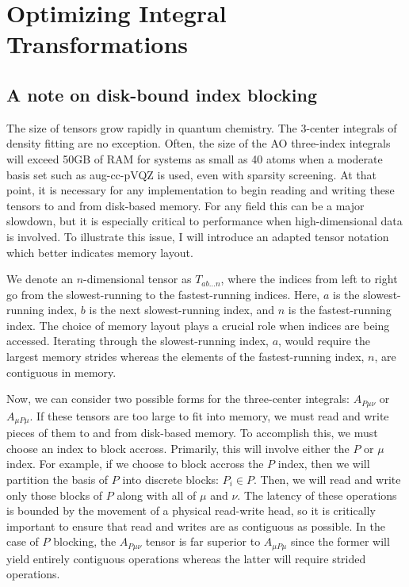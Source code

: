 \chapter{Optimizing Integral Transformations}

\section{A note on disk-bound index blocking}

The size of tensors grow rapidly in quantum chemistry.  The 3-center integrals of density fitting are no exception.
Often, the size of the AO three-index integrals will exceed 50GB of RAM for systems as small as 40 atoms when
a moderate basis set such as aug-cc-pVQZ is used, even with sparsity screening.  At that point, it is necessary for
any implementation to begin reading and writing these tensors to and from disk-based memory. For any field this can
be a major slowdown, but it is especially critical to performance when high-dimensional data is involved. To illustrate
this issue, I will introduce an adapted tensor notation which better indicates memory layout.

We denote an $n$-dimensional tensor as $T_{ab\hdots n}$, where the indices from left to right go from the slowest-running
to the fastest-running indices. Here, $a$ is the slowest-running index, $b$ is the next slowest-running
index, and $n$ is the fastest-running index. The choice of memory layout plays a crucial role when indices are being accessed.
Iterating through the slowest-running index, $a$, would require the largest memory strides whereas the elements 
of the fastest-running index, $n$, are contiguous in memory. 

Now, we can consider two possible forms for the three-center integrals: $A_{P\mu\nu}$ or $A_{\mu P\mu}$.
If these tensors are too large to fit into memory, we must read and write pieces of them to and from disk-based memory.
To accomplish this, we must choose an index to block accross. Primarily, this will involve either the $P$ or $\mu$ index.
For example, if we choose to block accross the $P$ index, then we will partition the basis of $P$ into discrete blocks: $P_i \in P$.
Then, we will read and write only those blocks of $P$ along with all of $\mu$ and $\nu$.
The latency of these operations is
bounded by the movement of a physical read-write head, so it is critically important to ensure that read and writes are as
contiguous as possible. In the case of $P$ blocking, the $A_{P\mu\nu}$ tensor is far superior to $A_{\mu P\mu}$ since the 
former will yield entirely contiguous operations whereas the latter will require strided operations.  

